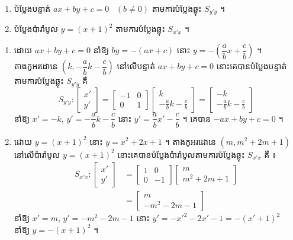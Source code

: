 \begin{example}[លំហាត់គំរូ]
\begin{enumerate}[a]
  \item បំប្លែងបន្ទាត់ $ax + by + c = 0$ \ $(b \ne 0)$ តាមការបំប្លែងឆ្លុះ $S_{y'y}$ ។
  \item បំប្លែងប៉ារ៉ាបូល $y = (x + 1)^2$ តាមការបំប្លែងឆ្លុះ $S_{x'x}$ ។
\end{enumerate}
\end{example}
\ans
\begin{enumerate}[a]
  \item ដោយ $ax + by + c = 0$ នាំឱ្យ $by = -(ax + c)$ នោះ $y = -\left(\dfrac{a}{b}x + \dfrac{c}{b}\right)$ ។ តាងកូអរដោនេ $\left(k, -\dfrac{a}{b}k - \dfrac{c}{b}\right)$ នៅលើបន្ទាត់ $ax + by + c = 0$ នោះគេបានបំប្លែងបន្ទាត់តាមការបំប្លែងឆ្លុះ $S_{y'y}$ គឺ
  \[ S_{y'y} : \begin{bmatrix} x'\\ y' \end{bmatrix} = \begin{bmatrix} -1 & 0\\ 0 & 1 \end{bmatrix}\begin{bmatrix} k\\ -\frac{a}{b}k - \frac{c}{b} \end{bmatrix} = \begin{bmatrix} -k\\ -\frac{a}{b}k - \frac{c}{b} \end{bmatrix} \]
  នាំឱ្យ $x' = -k$, $y' = -\dfrac{a}{b}k - \dfrac{c}{b}$ នោះ $y' = \dfrac{a}{b}x' - \dfrac{c}{b}$ ។ គេបាន $-ax + by + c = 0$ ។
  \item ដោយ $y = (x + 1)^2$ នោះ $y = x^2 + 2x + 1$ ។ តាងកូអរដោនេ $(m, m^2 + 2m + 1)$ នៅលើប៉ារ៉ាបូល $y = (x + 1)^2$ នោះគេបានបំប្លែងប៉ារ៉ាបូលតាមការបំប្លែងឆ្លុះ $S_{x'x}$ គឺ ៖
  \[
\begin{aligned}
S_{x'x} : \begin{bmatrix} x'\\ y' \end{bmatrix} &= \begin{bmatrix} 1 & 0\\ 0 & -1 \end{bmatrix}\begin{bmatrix} m\\ m^2 + 2m + 1 \end{bmatrix}\\
&= \begin{bmatrix} m\\ -m^2 - 2m - 1 \end{bmatrix}
\end{aligned}
\]
  នាំឱ្យ $x' = m$, $y' = -m^2 - 2m - 1$ នោះ $y' = -x'^2 - 2x' - 1 = -(x' + 1)^2$ នាំឱ្យ $y = -(x + 1)^2$ ។
\end{enumerate}


